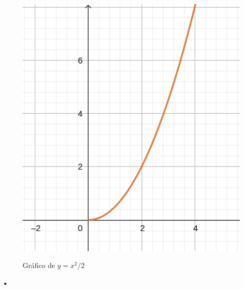 \documentclass{article}
\begin{document}
\begin{figure}[ht]
\caption{Gráfico de $y = x^2/2 $}
\includegraphics[scale=0.8]{../img/guide_01/ex_04.png} 
\centering
\label{fig:4}
\end{figure}\textbf{•}
\end{document}
